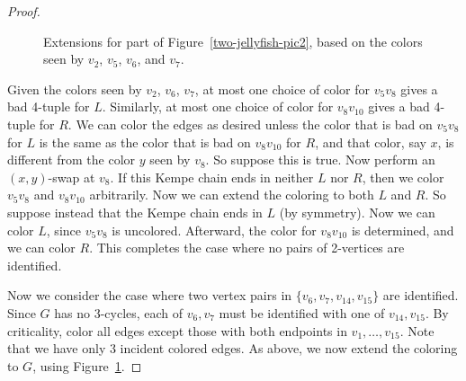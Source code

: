\documentclass[12pt]{article}
\theoremstyle{plain}
\theoremstyle{definition}
\theoremstyle{remark}
\begin{document}
\begin{proof}
\begin{figure}
\begin{center}
{{
}}
\end{center}
\caption{Extensions for part of Figure~\ref{two-jellyfish-pic2}, based on the
colors seen by $v_2$, $v_5$, $v_6$, and $v_7$. \label{two-jellyfish-colorings-pic}}
\end{figure}

Given the colors seen by $v_2$, $v_6$, $v_7$, at most one choice of color for $v_5v_8$ gives a bad 4-tuple
for $L$.  Similarly, at most one choice of color for $v_8v_{10}$ gives a bad
4-tuple for $R$.  We can color the edges as desired unless the color
that is bad on $v_5v_8$ for $L$ is the same as the color that is bad
on $v_8v_{10}$ for $R$, and that color, say $x$, is different from 
the color $y$ seen by $v_8$.  So suppose this is true.  
Now perform an $(x,y)$-swap at $v_8$.  If this Kempe chain ends in neither
$L$ nor $R$, then we color $v_5v_8$ and $v_8v_{10}$ arbitrarily.
Now we can extend the coloring to both $L$ and $R$.  So suppose instead that
the Kempe chain ends in $L$ (by symmetry).  Now we can color $L$, since $v_5v_8$ is
uncolored.  Afterward, the color for $v_8v_{10}$ is determined, and we can color
$R$.  This completes the case where no pairs of 2-vertices are identified.
\bigskip

Now we consider the case where two vertex pairs in $\{v_6,v_7,v_{14},v_{15}\}$
are identified.  Since $G$ has no 3-cycles, each of $v_6,v_7$ must be identified
with one of $v_{14},v_{15}$.  By criticality, color all edges except those with
both endpoints in $v_1,\ldots,v_{15}$.  
Note that we have only 3 incident colored edges. %
As above, we now extend the coloring to $G$, using
Figure~\ref{two-jellyfish-colorings-pic}.


\end{proof}
\end{document}
